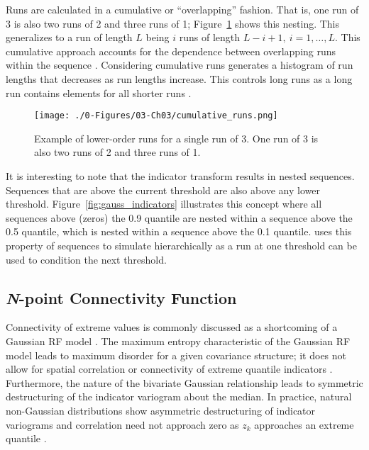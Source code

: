 Runs are calculated in a cumulative or ``overlapping'' fashion. That is, one run of 3 is also two runs of 2 and three runs of 1; Figure~\ref{fig:cumulative_runs} shows this nesting. This generalizes to a run of length $L$ being $i$ runs of length $L-i+1, \ i=1,\dots,L$. This cumulative approach accounts for the dependence between overlapping runs within the sequence \citep{mood1940distribution}. Considering cumulative runs generates a histogram of run lengths that decreases as run lengths increase. This controls long runs as a long run contains elements for all shorter runs \citep{ortiz2003characterization}.

\begin{figure}[htb!]
    \centering
    \texttt{[image: ./0-Figures/03-Ch03/cumulative\_runs.png]}
    \caption{Example of lower-order runs for a single run of 3. One run of 3 is also two runs of 2 and three runs of 1.}
    \label{fig:cumulative_runs}
\end{figure}

It is interesting to note that the indicator transform results in nested sequences. Sequences that are above the current threshold are also above any lower threshold. Figure~\ref{fig:gauss_indicators} illustrates this concept where all sequences above (zeros) the 0.9 quantile are nested within a sequence above the 0.5 quantile, which is nested within a sequence above the 0.1 quantile. \cite{ortiz2003characterization} uses this property of sequences to simulate hierarchically as a run at one threshold can be used to condition the next threshold.

\FloatBarrier
\subsection{\textit{N}-point Connectivity Function}
\label{subsec:03npoint}

Connectivity of extreme values is commonly discussed as a shortcoming of a Gaussian \gls{RF} model \citep{journel1993entropy,journel1989nongaussian}. The maximum entropy characteristic of the Gaussian \gls{RF} model leads to maximum disorder for a given covariance structure; it does not allow for spatial correlation or connectivity of extreme quantile indicators \citep{journel1989nongaussian}. Furthermore, the nature of the bivariate Gaussian relationship leads to symmetric destructuring of the indicator variogram about the median. In practice, natural non-Gaussian distributions show asymmetric destructuring of indicator variograms \citep{vincent2021multipleindicator} and correlation need not approach zero as $z_{k}$ approaches an extreme quantile \citep{journel1989nongaussian}.

